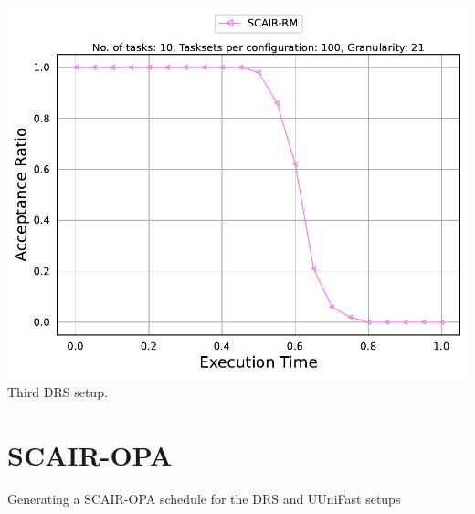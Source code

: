 \documentclass[]{article}
\begin{document}
\begin{minipage}[t]{0.48\linewidth}
            \includegraphics[width=\linewidth]{SCAIR-RM_3rd.pdf}
		Third DRS setup.
		\vspace{0.3cm}
                   

	\end{minipage}
        
	\clearpage
	\section{SCAIR-OPA}
{
\raggedleft Generating a SCAIR-OPA schedule for the DRS and UUniFast setups \newline
}
\end{document}
